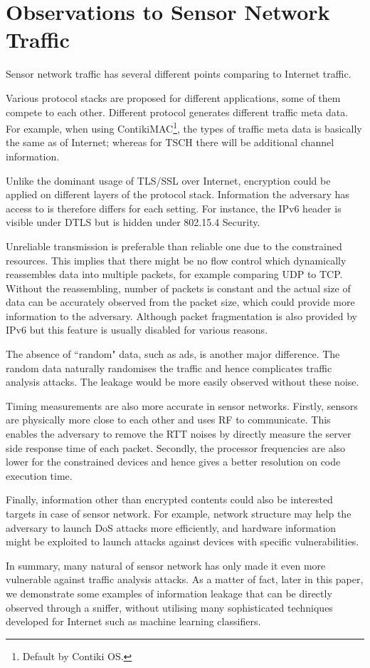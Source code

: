 \section{Observations to Sensor Network Traffic}

Sensor network traffic has several different points comparing to Internet traffic.

Various protocol stacks are proposed for different applications, some of them compete to each other. Different protocol generates different traffic meta data. For example, when using ContikiMAC\cite{ContikiMAC}\footnote{Default by Contiki OS.}, the types of traffic meta data is basically the same as of Internet; whereas for TSCH\cite{rfc7554} there will be additional channel information. 
		
Unlike the dominant usage of TLS/SSL over Internet, encryption could be applied on different layers of the protocol stack. Information the adversary has access to is therefore differs for each setting. For instance, the IPv6 header is visible under DTLS\cite{rfc6347} but is hidden under 802.15.4 Security\cite{802154}.

Unreliable transmission is preferable than reliable one due to the constrained resources. This implies that there might be no flow control which dynamically reassembles data into multiple packets, for example comparing UDP to TCP. Without the reassembling, number of packets is constant and the actual size of data can be accurately observed from the packet size, which could provide more information to the adversary. Although packet fragmentation is also provided by IPv6 but this feature is usually disabled for various reasons.

The absence of ``random" data, such as ads, is another major difference. The random data naturally randomises the traffic and hence complicates traffic analysis attacks. The leakage would be more easily observed without these noise.

Timing measurements are also more accurate in sensor networks. Firstly, sensors are physically more close to each other and uses RF to communicate. This enables the adversary to remove the RTT noises by directly measure the server side response time of each packet. Secondly, the processor frequencies are also lower for the constrained devices and hence gives a better resolution on code execution time.

Finally, information other than encrypted contents could also be interested targets in case of sensor network. For example, network structure may help the adversary to launch DoS attacks more efficiently, and hardware information might be exploited to launch attacks against devices with specific vulnerabilities.

In summary, many natural of sensor network has only made it even more vulnerable against traffic analysis attacks. As a matter of fact, later in this paper, we demonstrate some examples of information leakage that can be directly observed through a sniffer, without utilising many sophisticated techniques developed for Internet such as machine learning classifiers.
